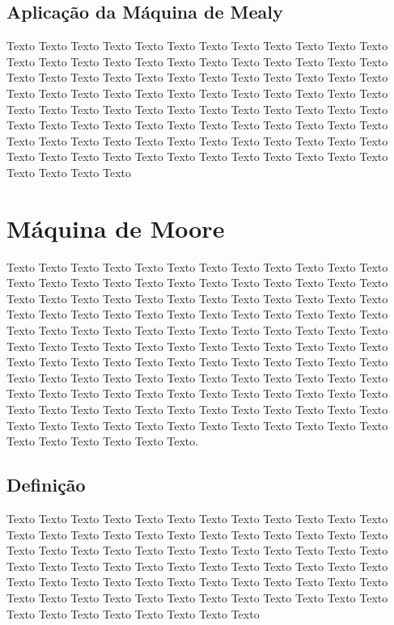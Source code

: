 \documentclass[a4paper]{article}
\begin{document}
\subsection{Aplicação da Máquina de Mealy }

Texto Texto Texto Texto Texto Texto Texto Texto Texto Texto Texto Texto Texto Texto Texto Texto Texto Texto Texto Texto Texto Texto Texto Texto Texto Texto Texto Texto Texto Texto Texto Texto Texto Texto Texto Texto Texto Texto Texto Texto Texto Texto Texto Texto Texto Texto Texto Texto Texto Texto Texto Texto Texto Texto Texto Texto Texto Texto Texto Texto Texto Texto Texto Texto Texto Texto Texto Texto Texto Texto Texto Texto Texto Texto Texto Texto Texto Texto Texto Texto Texto Texto Texto Texto Texto Texto Texto Texto Texto Texto Texto Texto Texto Texto Texto Texto Texto Texto Texto Texto 

\section{Máquina de Moore }


Texto Texto Texto Texto Texto Texto Texto Texto Texto Texto Texto Texto Texto Texto Texto Texto Texto Texto Texto Texto Texto Texto Texto Texto Texto Texto Texto Texto Texto Texto Texto Texto Texto Texto Texto Texto Texto Texto Texto Texto Texto Texto Texto Texto Texto Texto Texto Texto Texto Texto Texto Texto Texto Texto Texto Texto Texto Texto Texto Texto Texto Texto Texto Texto Texto Texto Texto Texto Texto Texto Texto Texto Texto Texto Texto Texto Texto Texto Texto Texto Texto Texto Texto Texto Texto Texto Texto Texto Texto Texto Texto Texto Texto Texto Texto Texto Texto Texto Texto Texto Texto Texto Texto Texto Texto Texto Texto Texto Texto Texto Texto Texto Texto Texto Texto Texto Texto Texto Texto Texto Texto Texto Texto Texto Texto Texto Texto Texto Texto Texto Texto Texto Texto Texto Texto Texto Texto Texto.

\subsection{Definição}

Texto Texto Texto Texto Texto Texto Texto Texto Texto Texto Texto Texto Texto Texto Texto Texto Texto Texto Texto Texto Texto Texto Texto Texto Texto Texto Texto Texto Texto Texto Texto Texto Texto Texto Texto Texto Texto Texto Texto Texto Texto Texto Texto Texto Texto Texto Texto Texto Texto Texto Texto Texto Texto Texto Texto Texto Texto Texto Texto Texto Texto Texto Texto Texto Texto Texto Texto Texto Texto Texto Texto Texto Texto Texto Texto Texto Texto Texto Texto Texto 
\end{document}
